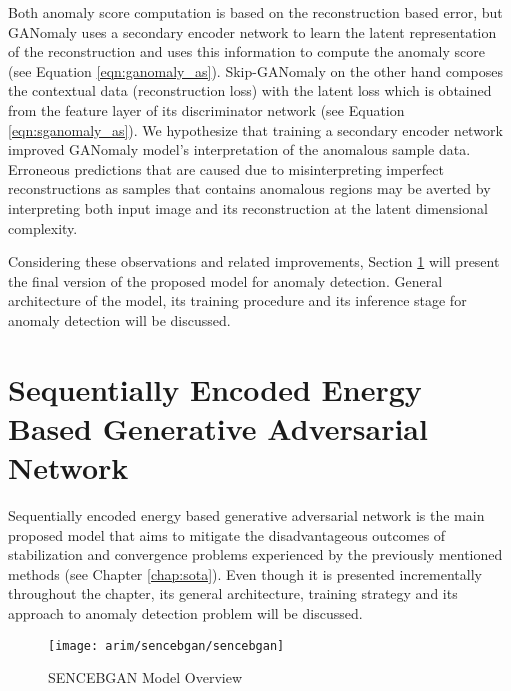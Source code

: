 Both anomaly score computation is based on the reconstruction based error, but GANomaly uses a
secondary encoder network to learn the latent representation of the reconstruction and uses this
information to compute the anomaly score (see Equation \ref{eqn:ganomaly_as}). Skip-GANomaly on the
other hand composes the contextual data (reconstruction loss) with the latent loss which is obtained
from the feature layer of its discriminator network (see Equation \ref{eqn:sganomaly_as}). We hypothesize
that training a secondary encoder network improved GANomaly model's interpretation of the anomalous
sample data. Erroneous predictions that are caused due to misinterpreting imperfect reconstructions
as samples that contains anomalous regions may be averted by interpreting both input image and its
reconstruction at the latent dimensional complexity. 

Considering these observations and related improvements, Section \ref{sec:sencebgan} will present the final version
of the proposed model for anomaly detection. General architecture of the model, its training
procedure and its inference stage for anomaly detection will be discussed.


\section{Sequentially Encoded Energy Based Generative Adversarial Network}
\label{sec:sencebgan}

Sequentially encoded energy based generative adversarial network is the main proposed model that
aims to mitigate the disadvantageous outcomes of stabilization and convergence problems experienced
by the previously mentioned methods (see Chapter \ref{chap:sota}). Even though it is presented
incrementally throughout the chapter, its general architecture, training strategy and its approach
to anomaly detection problem will be discussed.
\begin{figure}[h!]
	\centering
	\texttt{[image: arim/sencebgan/sencebgan]}
	\caption{SENCEBGAN Model Overview }
	\label{fig:sencebgan_model}
\end{figure}

